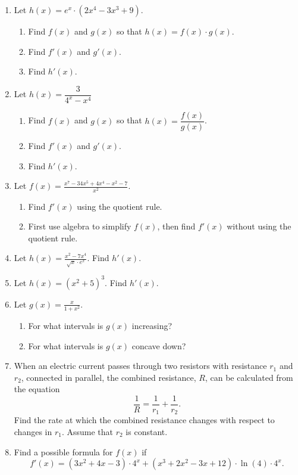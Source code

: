 \documentclass[11pt]{article}
\newcommand{\ds}{\displaystyle}
\begin{document}
\drawtitle
\begin{enumerate}
\item Let $h(x)=e^{x}\cdot (2x^4-3x^3+9)$.
  \begin{enumerate}
  \item Find $f(x)$ and $g(x)$ so that $h(x)=f(x)\cdot g(x)$.
    \vfill
  \item Find $f'(x)$ and $g'(x)$.
    \vfill
  \item Find $h'(x)$.
    \vfill
  \end{enumerate}

\item Let $h(x)=\dfrac{3}{4^x-x^4}$
  \begin{enumerate}
  \item Find $f(x)$ and $g(x)$ so that $h(x)=\dfrac{f(x)}{g(x)}$.
    \vfill
  \item Find $f'(x)$ and $g'(x)$.
    \vfill
  \item Find $h'(x)$.
    \vfill
  \end{enumerate}
  
\newpage

\item Let $\ds f(x) = \frac{x^7-34x^5+4x^4-x^2-7}{x^2}$.
  \begin{enumerate}
  \item Find $f'(x)$ using the quotient rule.
    \vfill
  \item First use algebra to simplify $f(x)$, then find $f'(x)$
    without using the quotient rule.  \vfill
  \end{enumerate}

\newpage

\item Let $h(x)=\ds\frac{x^2-7x^4}{\sqrt{x}\cdot e^{x}}$.  Find $h'(x)$.

\newpage

\item Let $h(x)=(x^2+5)^3$.  Find $h'(x)$.

\newpage
\item Let $g(x)=\ds\frac{x}{1+x^2}$.
  \begin{enumerate}
  \item For what intervals is $g(x)$ increasing?
    \vfill
  \item For what intervals is $g(x)$ concave down?
    \vfill
  \end{enumerate}
  

\newpage
\item When an electric current passes through two resistors with
  resistance $r_1$ and $r_2$, connected in parallel, the combined
  resistance, $R$, can be calculated from the equation
  \[
  \frac{1}{R} = \frac{1}{r_1} + \frac{1}{r_2}.
  \]
  Find the rate at which the combined resistance changes with respect
  to changes in $r_1$. Assume that $r_2$ is constant.

  \vfill\vfill

\item Find a possible formula for $f(x)$ if
  \[
  f'(x) = (3x^2+4x-3)\cdot 4^x + (x^3+2x^2-3x+12)\cdot\ln(4)\cdot 4^x.
  \]
  \vfill

\end{enumerate}
\end{document}
